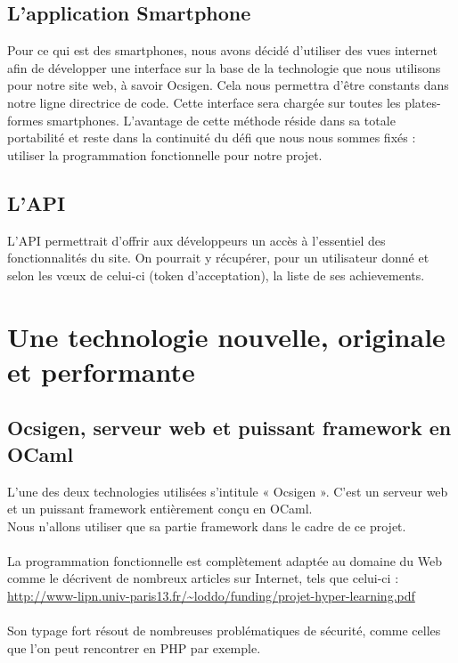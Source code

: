 \documentclass{life-fr}
\begin{document}
\section{L'application Smartphone}

Pour ce qui est des smartphones, nous avons décidé d'utiliser des vues internet afin de développer une interface sur la base de la technologie que nous utilisons pour notre site web, à savoir Ocsigen. Cela nous permettra d'être constants dans notre ligne directrice de code. Cette interface sera chargée sur toutes les plates-formes smartphones. L'avantage de cette méthode réside dans sa totale portabilité et reste dans la continuité du défi que nous nous sommes fixés : utiliser la programmation fonctionnelle pour notre projet.

\section{L'API}

L'API permettrait d'offrir aux développeurs un accès à l'essentiel des fonctionnalités du site. On pourrait y récupérer, pour un utilisateur donné et selon les vœux de celui-ci (token d'acceptation), la liste de ses achievements.



\chapter{Une technologie nouvelle, originale et performante}

\section{Ocsigen, serveur web et puissant framework en OCaml}

L'une des deux technologies utilisées s'intitule « Ocsigen ». C'est un serveur web et un puissant framework entièrement conçu en OCaml.\\
Nous n'allons utiliser que sa partie framework dans le cadre de ce projet.\\
  \\
La programmation fonctionnelle est complètement adaptée au domaine du Web comme le décrivent de nombreux articles sur Internet, tels que celui-ci :\\
\url{http://www-lipn.univ-paris13.fr/~loddo/funding/projet-hyper-learning.pdf}\\
\\
Son typage fort résout de nombreuses problématiques de sécurité, comme celles que l'on peut rencontrer en PHP par exemple.\\
\end{document}
